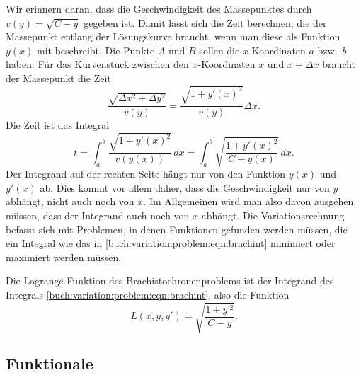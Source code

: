 Wir erinnern daran, dass die Geschwindigkeit des Massepunktes durch
$v(y)=\sqrt{C-y}$ gegeben ist.
Damit lässt sich die Zeit berechnen, die der Massepunkt entlang der
Lösungskurve braucht, wenn man diese als Funktion $y(x)$ mit beschreibt.
Die Punkte $A$ und $B$ sollen die $x$-Koordinaten $a$ bzw.~$b$ haben.
Für das Kurvenstück zwischen den $x$-Koordinaten $x$ und $x+\Delta x$
braucht der Massepunkt die Zeit
\[
\frac{ \sqrt{\Delta x^2 + \Delta y^2} }{v(y)}
=
\frac{ \sqrt{1 + y'(x)^2} }{ v(y) } \Delta x.
\]
Die Zeit ist das Integral
\begin{equation}
t
=
\int_a^b \frac{\sqrt{1+y'(x)^2}}{v(y(x))}\,dx
=
\int_a^b \sqrt{\frac{1+y'(x)^2}{C-y(x)}}\,dx.
\label{buch:variation:problem:eqn:brachint}
\end{equation}
Der Integrand auf der rechten Seite hängt nur von den Funktion $y(x)$
und $y'(x)$ ab.
Dies kommt vor allem daher, dass die Geschwindigkeit nur von $y$ abhängt,
nicht auch noch von $x$.
Im Allgemeinen wird man also davon ausgehen müssen, dass der Integrand
auch noch von $x$ abhängt.
Die Variationsrechnung befasst sich mit Problemen, in denen Funktionen
gefunden werden müssen, die ein Integral wie das in
\eqref{buch:variation:problem:eqn:brachint}
minimiert oder maximiert werden müssen.

\begin{definition}
Die Lagrange-Funk\-tion des Brachistochronenproblems ist der
Integrand des Integrals
\eqref{buch:variation:problem:eqn:brachint},
%
also die Funktion
\[
L(x,y,y')
=
\sqrt{\frac{1+y^{\prime 2}}{C-y}}.
\]
\end{definition}

%
%
\subsection{Funktionale}


